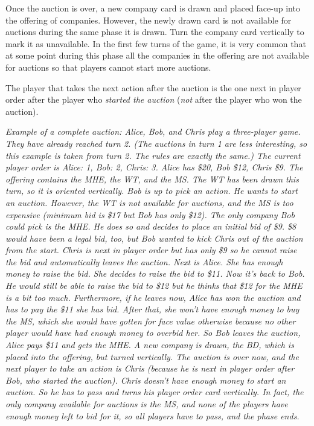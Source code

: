 \documentclass[10pt,final]{report}
\begin{document}
\begin{multicols}{2}
Once the auction is over, a new company card is drawn and placed
face-up into the offering of companies. However, the newly drawn card
is not available for auctions during the same phase it is drawn. Turn
the company card vertically to mark it as unavailable. In the first
few turns of the game, it is very common that at some point during
this phase all the companies in the offering are not available for
auctions so that players cannot start more auctions.

The player that takes the next action after the auction is the one
next in player order after the player who \emph{started the auction}
(\emph{not} after the player who won the auction).

\emph{Example of a complete auction: Alice, Bob, and Chris play a
  three-player game. They have already reached turn 2. (The auctions
  in turn 1 are less interesting, so this example is taken from turn
  2. The rules are exactly the same.) The current player order is
  Alice: 1, Bob: 2, Chris: 3. Alice has \$20, Bob \$12, Chris \$9. The
  offering contains the MHE, the WT, and the MS. The WT has been
  drawn this turn, so it is oriented vertically. Bob is up to pick an
  action. He wants to start an auction. However, the WT is not
  available for auctions, and the MS is too expensive (minimum bid is
  \$17 but Bob has only \$12). The only company Bob could pick is the
  MHE. He does so and decides to place an initial bid of \$9. \$8
  would have been a legal bid, too, but Bob wanted to kick Chris out
  of the auction from the start. Chris is next in player order but has
  only \$9 so he cannot raise the bid and automatically leaves the
  auction. Next is Alice. She has enough money to raise the bid. She
  decides to raise the bid to \$11. Now it's back to Bob. He would
  still be able to raise the bid to \$12 but he thinks that \$12 for
  the MHE is a bit too much. Furthermore, if he leaves now, Alice has
  won the auction and has to pay the \$11 she has bid. After that, she
  won't have enough money to buy the MS, which she would have gotten
  for face value otherwise because no other player would have had
  enough money to overbid her. So Bob leaves the auction, Alice pays
  \$11 and gets the MHE. A new company is drawn, the BD, which is
  placed into the offering, but turned vertically. The auction is over
  now, and the next player to take an action is Chris (because he is
  next in player order after Bob, who started the auction). Chris
  doesn't have enough money to start an auction. So he has to pass and
  turns his player order card vertically. In fact, the only company
  available for auctions is the MS, and none of the players have enough
  money left to bid for it, so all players have to pass, and the phase
  ends.}


\end{multicols}
\end{document}
